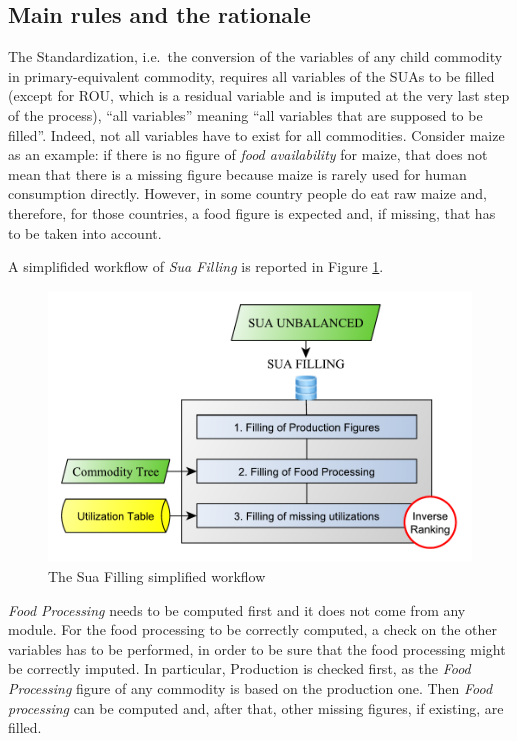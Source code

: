 \documentclass[]{article}
\begin{document}
\subsection*{Main rules and the
rationale}\label{main-rules-and-the-rationale}

The Standardization, i.e.~the conversion of the variables of any child
commodity in primary-equivalent commodity, requires all variables of the
SUAs to be filled (except for ROU, which is a residual variable and is
imputed at the very last step of the process), ``all variables'' meaning
``all variables that are supposed to be filled''. Indeed, not all
variables have to exist for all commodities. Consider maize as an
example: if there is no figure of \emph{food availability} for maize,
that does not mean that there is a missing figure because maize is
rarely used for human consumption directly. However, in some country
people do eat raw maize and, therefore, for those countries, a food
figure is expected and, if missing, that has to be taken into account.

A simplifided workflow of \emph{Sua Filling} is reported in Figure
\ref{fig:f3}.

\begin{figure}[H]

{\centering \includegraphics[width=0.6\linewidth]{images/03_SuaFilling} 

}

\caption{\label{fig:f3}The Sua Filling simplified workflow}\label{fig:f3}
\end{figure}

\emph{Food Processing} needs to be computed first and it does not come
from any module. For the food processing to be correctly computed, a
check on the other variables has to be performed, in order to be sure
that the food processing might be correctly imputed. In particular,
Production is checked first, as the \emph{Food Processing} figure of any
commodity is based on the production one. Then \emph{Food processing}
can be computed and, after that, other missing figures, if existing, are
filled.
\end{document}

